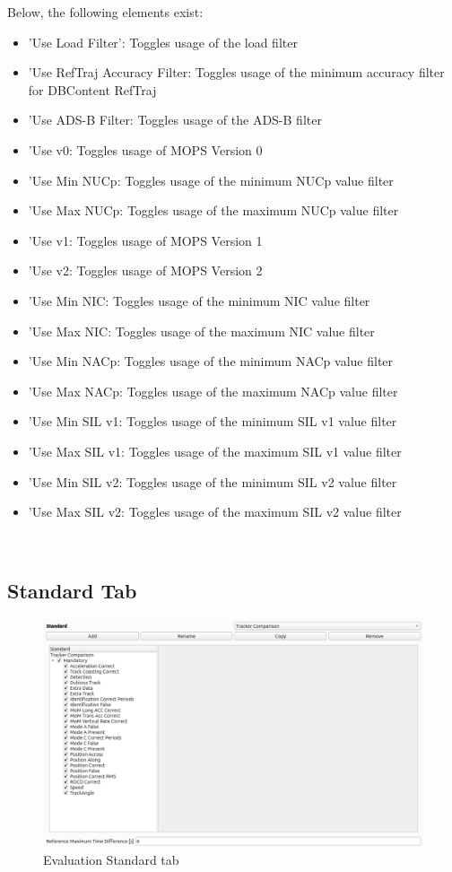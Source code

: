 Below, the following elements exist:
\begin{itemize}  
\item 'Use Load Filter': Toggles usage of the load filter
\item 'Use RefTraj Accuracy Filter: Toggles usage of the minimum accuracy filter for DBContent RefTraj
\item 'Use ADS-B Filter: Toggles usage of the ADS-B filter
\item 'Use v0: Toggles usage of MOPS Version 0
\item 'Use Min NUCp: Toggles usage of the minimum NUCp value filter
\item 'Use Max NUCp: Toggles usage of the maximum NUCp value filter
\item 'Use v1: Toggles usage of MOPS Version 1
\item 'Use v2: Toggles usage of MOPS Version 2
\item 'Use Min NIC: Toggles usage of the minimum NIC value filter
\item 'Use Max NIC: Toggles usage of the maximum NIC value filter
\item 'Use Min NACp: Toggles usage of the minimum NACp value filter
\item 'Use Max NACp: Toggles usage of the maximum NACp value filter
\item 'Use Min SIL v1: Toggles usage of the minimum SIL v1 value filter
\item 'Use Max SIL v1: Toggles usage of the maximum SIL v1 value filter
\item 'Use Min SIL v2: Toggles usage of the minimum SIL v2 value filter
\item 'Use Max SIL v2: Toggles usage of the maximum SIL v2 value filter
\end{itemize}
\ \\

\subsection{Standard Tab}

\begin{figure}[H]
  \hspace*{-2cm}
    \includegraphics[width=18cm,frame]{figures/eval_standard.png}
  \caption{Evaluation Standard tab}
\end{figure}


